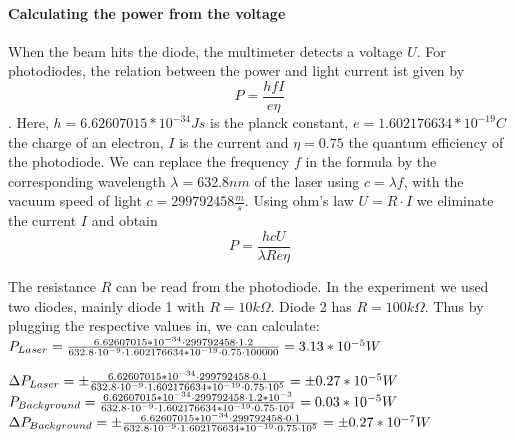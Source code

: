 \documentclass{article}
\begin{document}
\paragraph{Calculating the power from the voltage}

When the beam hits the diode, the multimeter detects a voltage $U$. For photodiodes, the relation between the power and light current ist given by 
\cite{Quantenausbeute} 
\begin{equation} 
P = \frac{hfI}{e\eta}
\end{equation}
.  
Here, $h = 6.62607015*10^{-34} Js$ is the planck constant, $e = 1.602176634*10^{-19} C$ the charge of an electron, $I$ is the current and $\eta = 0.75$ the quantum efficiency of the photodiode. We can replace the frequency $f$ in the formula by the corresponding wavelength $\lambda = 632.8 nm$ of the laser using $c= \lambda f$, with the vacuum speed of light  $c = 299792458 \frac{m}{s}$. Using ohm's law $ U= R \cdot I$ we eliminate the current $I$ and obtain 
\begin{equation}
P = \frac{hcU}{\lambda Re \eta}
\label{powerfromvoltage}
\end{equation}

The resistance $R$ can be read from the photodiode. In the experiment we used two diodes, mainly diode 1 with $R=10 k\Omega$. Diode 2 has $R= 100 k\Omega$. Thus by plugging the respective values in, we can calculate:
\\

$P_{Laser} =  \frac{6.62607015*10^{-34}\cdot299792458\cdot1.2}{632.8\cdot10^{-9}\cdot1.602176634*10^{-19}\cdot0.75\cdot100000}=3.13*10^{-5} W \vspace{2cm}$


$\Delta P_{Laser}= \pm \frac{6.62607015*10^{-34}\cdot299792458\cdot0.1}{632.8\cdot10^{-9}\cdot1.602176634*10^{-19}\cdot0.75\cdot10^{5}} =\pm 0.27*10^{-5} W\vspace{2cm}$\\

$P_{Background} =  \frac{6.62607015*10^{-34}\cdot299792458\cdot1.2*10^{-3}}{632.8\cdot10^{-9}\cdot1.602176634*10^{-19}\cdot0.75\cdot10^{4}}=0.03*10^{-5}W \vspace{2cm}$\\

$\Delta P_{Background} = \pm \frac{6.62607015*10^{-34}\cdot299792458\cdot0.1}{632.8\cdot10^{-9}\cdot1.602176634*10^{-19}\cdot0.75\cdot10^{5}} =\pm 0.27*10^{-7}W \vspace{2cm}$\\
\end{document}
